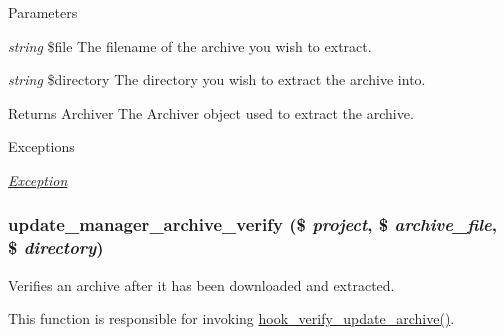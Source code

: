 \begin{DoxyParams}{Parameters}
\item[{\em string}]\$file The filename of the archive you wish to extract. \item[{\em string}]\$directory The directory you wish to extract the archive into.\end{DoxyParams}
\begin{DoxyReturn}{Returns}
Archiver The Archiver object used to extract the archive.
\end{DoxyReturn}

\begin{DoxyExceptions}{Exceptions}
\item[{\em \hyperlink{classException}{Exception}}]\end{DoxyExceptions}
\hypertarget{group__update__manager__file_ga8c352241e56ce6de6b1064725d84801b}{
\subsubsection[{update\_\-manager\_\-archive\_\-verify}]{\setlength{\rightskip}{0pt plus 5cm}update\_\-manager\_\-archive\_\-verify (\$ {\em project}, \/  \$ {\em archive\_\-file}, \/  \$ {\em directory})}}
\label{group__update__manager__file_ga8c352241e56ce6de6b1064725d84801b}
Verifies an archive after it has been downloaded and extracted.

This function is responsible for invoking \hyperlink{group__update__manager__file_ga68a5dd6bec824909f46d9458991eaf42}{hook\_\-verify\_\-update\_\-archive()}.


